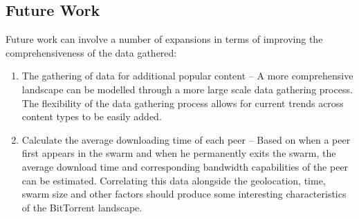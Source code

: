 \documentclass[conference]{IEEEtran}
\begin{document}
\subsection{Future Work}
\label{futurework}
Future work can involve a number of expansions in terms of improving the comprehensiveness of the data gathered:
\begin{enumerate}
\item The gathering of data for additional popular content -- A more comprehensive landscape can be modelled through a more large scale data gathering process. The flexibility of the data gathering process allows for current trends across content types to be easily added.
\item Calculate the average downloading time of each peer -- Based on when a peer first appears in the swarm and when he permanently exits the swarm, the average download time and corresponding bandwidth capabilities of the peer can be estimated. Correlating this data alongside the geolocation, time, swarm size and other factors should produce some interesting characteristics of the BitTorrent landscape.
\end{enumerate}































\end{document}
